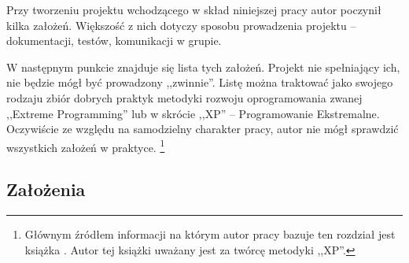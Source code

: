 Przy tworzeniu projektu wchodzącego w skład niniejszej pracy autor poczynił kilka założeń. Większość z nich dotyczy sposobu prowadzenia projektu -- dokumentacji, testów, komunikacji w grupie.

W następnym punkcie znajduje się lista tych założeń. Projekt nie spełniający ich, nie będzie mógł być prowadzony ,,zwinnie''. Listę można traktować jako swojego rodzaju zbiór dobrych praktyk metodyki rozwoju oprogramowania zwanej ,,Extreme Programming'' lub w skrócie ,,XP'' -- Programowanie Ekstremalne. Oczywiście ze względu na samodzielny charakter pracy, autor nie mógł sprawdzić wszystkich założeń w praktyce. \footnote{Głównym źródłem informacji na którym autor pracy bazuje ten rozdział jest książka \cite{Bec99}. Autor tej książki uważany jest za twórcę metodyki ,,XP''.}

\subsection{Założenia}
\label{sec:ZMTOzalozenia}


